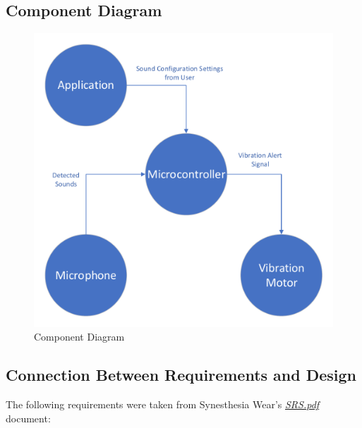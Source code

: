 \documentclass[12pt, titlepage]{article}
\begin{document}
\subsection{Component Diagram}
\begin{figure}[H]
  \includegraphics[width=\textwidth,height=\textheight,keepaspectratio]{ComponentDiagram.pdf}
  \caption{Component Diagram}
  \label{ComponentDiagram} 
\end{figure}

\subsection{Connection Between Requirements and Design} \label{SecConnection}

The following requirements were taken from Synesthesia Wear's
\href{https://github.com/jordanbierbrier/capstone/blob/main/docs/SRS/SRS.pdf}{\textit{SRS.pdf}} document:
\end{document}
